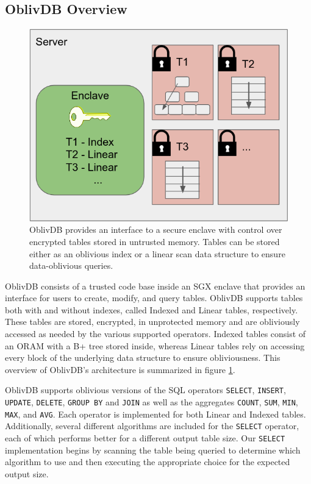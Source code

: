 \documentclass[conference]{IEEEtran}
\def\name/{OblivDB}
\begin{document}
\subsection{\name/ Overview}
\begin{figure}
\includegraphics[width=\linewidth]{figure_server.png}
\caption{\name/ provides an interface to a secure enclave with control over encrypted tables stored in untrusted memory. Tables can be stored either as an oblivious index or a linear scan data structure to ensure data-oblivious queries.}
\label{arch}
\end{figure}
\name/ consists of a trusted code base inside an SGX enclave that provides an interface for users to create, modify, and query tables. \name/ supports tables both with and without indexes, called Indexed and Linear tables, respectively. These tables are stored, encrypted, in unprotected memory and are obliviously accessed as needed by the various supported operators. Indexed tables consist of an ORAM with a B+ tree stored inside, whereas Linear tables rely on accessing every block of the underlying data structure to ensure obliviousness. This overview of \name/'s architecture is summarized in figure \ref{arch}.

  \name/ supports oblivious versions of the SQL operators \texttt{SELECT}, \texttt{INSERT}, \texttt{UPDATE}, \texttt{DELETE}, \texttt{GROUP BY} and \texttt{JOIN} as well as the aggregates \texttt{COUNT}, \texttt{SUM}, \texttt{MIN}, \texttt{MAX}, and \texttt{AVG}. Each operator is implemented for both Linear and Indexed tables. Additionally, several different algorithms are included for the \texttt{SELECT} operator, each of which performs better for a different output table size. Our \texttt{SELECT} implementation begins by scanning the table being queried to determine which algorithm to use and then executing the appropriate choice for the expected output size. 
  
\end{document}
